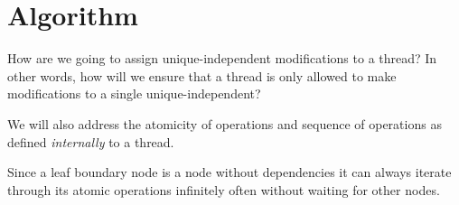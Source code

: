 \section{Algorithm}

How are we going to assign unique-independent modifications to a thread? In other words, how will we ensure that a thread is only allowed to make modifications to a single unique-independent?

We will also address the atomicity of operations and sequence of operations as defined \textit{internally} to a thread.

Since a leaf boundary node is a node without dependencies it can always iterate through its atomic operations infinitely often without waiting for other nodes.